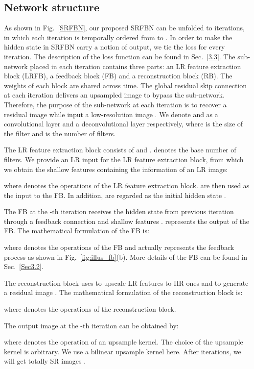\documentclass[10pt,twocolumn,letterpaper]{article}
\begin{document}
	\subsection{Network structure}
	As shown in Fig.~\ref{SRFBN}, our proposed SRFBN can be unfolded to  iterations, in which each iteration  is temporally ordered from  to . In order to make the hidden state in SRFBN carry a notion of output, we tie the loss for every iteration. The description of the loss function can be found in Sec.~\ref{3.3}. The sub-network placed in each iteration  contains three parts: an LR feature extraction block (LRFB), a feedback block (FB) and a reconstruction block (RB). The weights of each block are shared across time. The global residual skip connection at each iteration  delivers an upsampled image to bypass the sub-network. Therefore, the purpose of the sub-network at each iteration  is to recover a residual image  while input a low-resolution image . We denote  and  as a convolutional layer and a deconvolutional layer respectively, where  is the size of the filter and  is the number of filters. 
	
	The LR feature extraction block consists of  and .  denotes the base number of filters. We provide an LR input  for the LR feature extraction block, from which we obtain the shallow features  containing the information of an LR image:
	
	where  denotes the operations of the LR feature extraction block.  are then used as the input to the FB. In addition,  are regarded as the initial hidden state .
	
	The FB at the -th iteration receives the hidden state from previous iteration  through a feedback connection and shallow features .  represents the output of the FB. The mathematical formulation of the FB is:	
	
	where  denotes the operations of the FB and actually represents the feedback process as shown in Fig.~\ref{fig:illus_fb}(b). More details of the FB can be found in Sec.~\ref{Sec3.2}. 
	
	 The reconstruction block uses  to upscale LR features  to HR ones and  to generate a residual image . The mathematical formulation of the reconstruction block is:
	
	where  denotes the operations of the reconstruction block. 
	
	The output image  at the -th iteration can be obtained by:
	
	where  denotes the operation of an upsample kernel. The choice of the upsample kernel is arbitrary. We use a bilinear upsample kernel here.
	After  iterations, we will get totally  SR images .  
	
\end{document}
